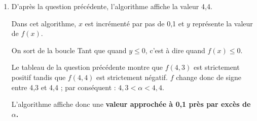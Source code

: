 \begin{corrige}
\begin{enumerate}
\begin{enumerate}[label=\alph*.]
\begin{center}
               \end{center}
               \item %
               D'après la question précédente, l'algorithme affiche la valeur 4,4.
               \par
               Dans cet algorithme, $x$ est incrémenté par pas de 0,1 et $y$ représente la valeur de $f(x)$.
               \par
               On sort de la boucle \og Tant que \fg{} quand $y \leqslant 0$, c'est à dire quand $f(x) \leqslant 0$.
               \par
               Le tableau de la question précédente montre que $f(4,3)$ est strictement positif tandis que $f(4,4)$ est strictement négatif. $f$ change donc de signe entre 4,3 et 4,4 ; par conséquent : ${4,3 < \alpha < 4,4}$.
               \par
               L'algorithme affiche donc une \textbf{valeur approchée à 0,1 près par excès de $\alpha$.}
               \par
          \end{enumerate}
          \par
     \end{enumerate}
\end{corrige}
